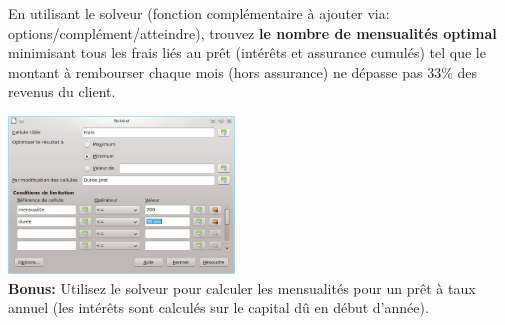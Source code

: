 \documentclass[a4paper]{article}
\begin{document}
\begin{flushleft} %
\exost En utilisant le solveur (fonction compl\'ementaire \`a ajouter via: options/compl\'ement/atteindre),
trouvez \textbf{le nombre de mensualit\'es optimal} minimisant
tous les frais li\'es au pr\^et (int\'er\^ets et assurance cumul\'es) tel que le montant 
\`a rembourser chaque mois (hors assurance) ne d\'epasse pas 33\% des revenus du client.
\end{flushleft}
\vspace{-0.4cm}
\centering\includegraphics[width=0.45\textwidth]{img/solveur.jpg}\\
\flushleft \textbf{Bonus:} Utilisez le solveur pour calculer les mensualit\'es pour un pr\^et \`a taux annuel (les int\'er\^ets sont calcul\'es sur le capital d\^u en d\'ebut d'ann\'ee).
\end{document}
